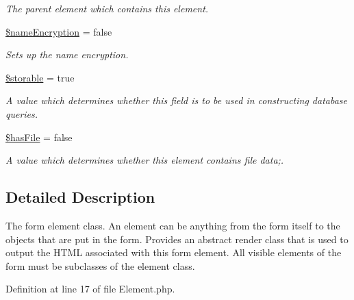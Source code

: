\begin{DoxyCompactItemize}
\begin{DoxyCompactList}\small\item\em The parent element which contains this element. \item\end{DoxyCompactList}\item 
\hyperlink{class_element_aa7f6ba35fe9572b1c2cbe6395711ea12}{\$nameEncryption} = false
\begin{DoxyCompactList}\small\item\em Sets up the name encryption. \item\end{DoxyCompactList}\item 
\hypertarget{class_element_aed9414caf0ce09d8688c56ddf16fc081}{
\hyperlink{class_element_aed9414caf0ce09d8688c56ddf16fc081}{\$storable} = true}
\label{class_element_aed9414caf0ce09d8688c56ddf16fc081}

\begin{DoxyCompactList}\small\item\em A value which determines whether this field is to be used in constructing database queries. \item\end{DoxyCompactList}\item 
\hypertarget{class_element_a96fa4d9bd62a2c8abd7b51f0c64b2dd3}{
\hyperlink{class_element_a96fa4d9bd62a2c8abd7b51f0c64b2dd3}{\$hasFile} = false}
\label{class_element_a96fa4d9bd62a2c8abd7b51f0c64b2dd3}

\begin{DoxyCompactList}\small\item\em A value which determines whether this element contains file data;. \item\end{DoxyCompactList}\end{DoxyCompactItemize}


\subsection{Detailed Description}
The form element class. An element can be anything from the form itself to the objects that are put in the form. Provides an abstract render class that is used to output the HTML associated with this form element. All visible elements of the form must be subclasses of the element class. 

Definition at line 17 of file Element.php.



